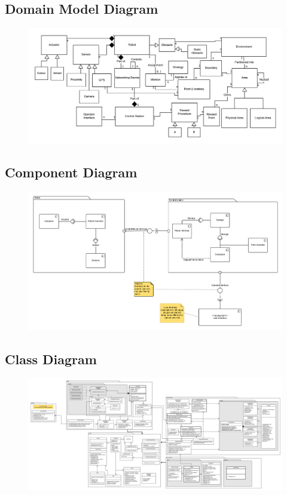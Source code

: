 \subsection{Domain Model Diagram}
\begin{figure}[H]
\includegraphics[width=22cm,angle=-90]{docs/assignments/Final_project/domain_model.png}
\end{figure}
\newpage

\subsection{Component Diagram}
\begin{figure}[H]
    \includegraphics[width=22cm,angle=-90]{docs/assignments/Final_project/component_diagram.png}
\end{figure}
\newpage

\subsection{Class Diagram}
\begin{figure}[H]
    \includegraphics[width=22cm,angle=-90]{docs/assignments/Final_project/class_diagram.png}
\end{figure}
\newpage

